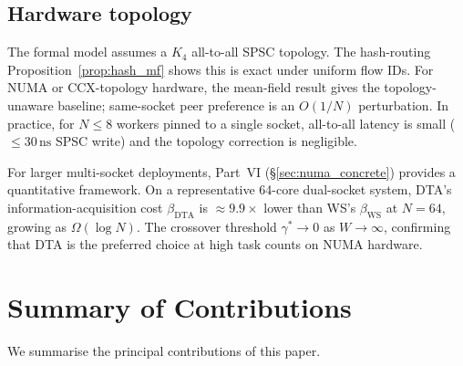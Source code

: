 \documentclass[11pt,a4paper]{report}
\begin{document}
\subsection{Hardware topology}

The formal model assumes a $K_4$ all-to-all SPSC topology.
The hash-routing Proposition~\ref{prop:hash_mf} shows this is exact
under uniform flow IDs.  For NUMA or CCX-topology hardware, the
mean-field result gives the topology-unaware baseline; same-socket
peer preference is an $O(1/N)$ perturbation.  In practice, for
$N \leq 8$ workers pinned to a single socket, all-to-all latency is
small ($\leq 30\,\mathrm{ns}$ SPSC write) and the topology correction
is negligible.

For larger multi-socket deployments, Part~VI (\S\ref{sec:numa_concrete})
provides a quantitative framework.  On a representative 64-core dual-socket
system, DTA's information-acquisition cost $\beta_{\mathrm{DTA}}$ is
$\approx 9.9\times$ lower than WS's $\beta_{\mathrm{WS}}$ at $N=64$,
growing as $\Omega(\log N)$.  The crossover threshold $\gamma^* \to 0$
as $W \to \infty$, confirming that DTA is the preferred choice at high
task counts on NUMA hardware.

\section{Summary of Contributions}
\label{sec:contributions}

We summarise the principal contributions of this paper.
\end{document}
